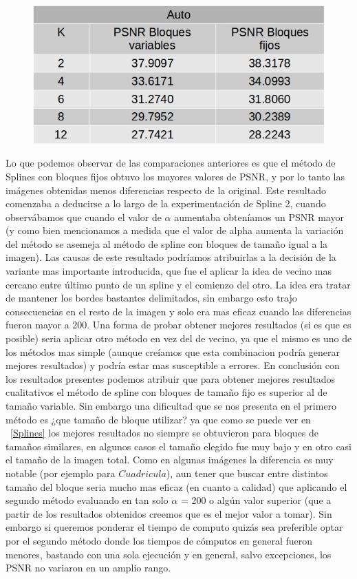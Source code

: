 \documentclass[a4paper]{article}
\begin{document}
    
     \begin{figure}[H]
    \centering
    \includegraphics[scale=0.4]{imagenes/autoMetodosDif.jpg}
	\label{autoe}
    \end{figure}

Lo que podemos observar de las comparaciones anteriores es que el método de Splines con bloques fijos obtuvo los mayores valores de PSNR, y por lo tanto las imágenes obtenidas menos diferencias respecto de la original. Este resultado comenzaba a deducirse a lo largo  de la experimentación de Spline 2, cuando observábamos que cuando el valor de $\alpha$ aumentaba obteníamos un PSNR mayor (y como bien mencionamos a medida que el valor de alpha aumenta la variación del método se asemeja al método de spline con bloques de tamaño igual a la imagen). Las causas de este resultado podríamos atribuirlas a la decisión de la variante mas importante introducida, que fue el aplicar la idea de vecino mas cercano entre último punto de un spline y el comienzo del otro. La idea era tratar de mantener los bordes bastantes delimitados, sin embargo esto trajo consecuencias en el resto de la imagen y solo era mas eficaz cuando las diferencias fueron mayor a 200. Una forma de probar obtener mejores resultados (si es que es posible) seria aplicar otro método en vez del de vecino, ya que el mismo es uno de los métodos mas simple (aunque creíamos que esta combinacion podría generar mejores resultados) y podría estar mas susceptible a errores.
En conclusión con los resultados presentes podemos atribuir que para obtener mejores resultados cualitativos el método de spline con bloques de tamaño fijo es superior al de tamaño variable. Sin embargo una dificultad que se nos presenta en el primero método es ¿que tamaño de bloque utilizar? ya que como se puede ver en ~\ref{Splines} los mejores resultados no siempre se obtuvieron para bloques de tamaños similares, en algunos casos el tamaño elegido fue muy bajo y en otro casi el tamaño de la imagen total. Como en algunas imágenes la diferencia es muy notable (por ejemplo para $Cuadricula$), aun tener que buscar entre distintos tamaño del bloque seria mucho mas eficaz (en cuanto a calidad) que aplicando el segundo método evaluando en tan solo $\alpha$ = 200 o algún valor superior (que a partir de los resultados obtenidos creemos que es el mejor valor a tomar). Sin embargo si queremos ponderar el tiempo de computo quizás sea preferible optar por el segundo método donde los tiempos de cómputos en general fueron menores, bastando con una sola ejecución y en general, salvo excepciones, los PSNR no variaron en un amplio rango.   
\end{document}
